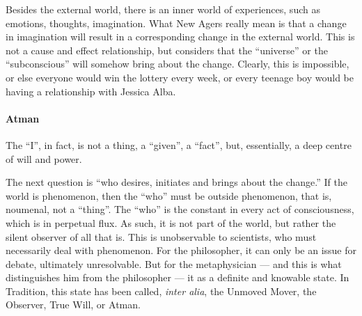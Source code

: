 Besides the external world, there is an inner world of experiences, such as emotions, thoughts, imagination. What New Agers really mean is that a change in imagination will result in a corresponding change in the external world. This is not a cause and effect relationship, but considers that the “universe” or the “subconscious” will somehow bring about the change. Clearly, this is impossible, or else everyone would win the lottery every week, or every teenage boy would be having a relationship with Jessica Alba.

\paragraph{Atman}
\begin{quotex}
The “I”, in fact, is not a thing, a “given”, a “fact”, but, essentially, a deep centre of will and power. 

\end{quotex}
The next question is “who desires, initiates and brings about the change.” If the world is phenomenon, then the “who” must be outside phenomenon, that is, noumenal, not a “thing”. The “who” is the constant in every act of consciousness, which is in perpetual flux. As such, it is not part of the world, but rather the silent observer of all that is. This is unobservable to scientists, who must necessarily deal with phenomenon. For the philosopher, it can only be an issue for debate, ultimately unresolvable. But for the metaphysician — and this is what distinguishes him from the philosopher — it as a definite and knowable state. In Tradition, this state has been called, \emph{inter alia}, the Unmoved Mover, the Observer, True Will, or Atman.

